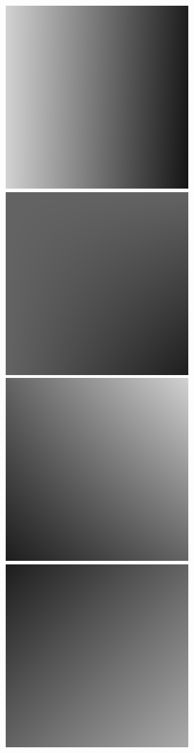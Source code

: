 \documentclass{beamer}
\begin{document}
\begin{frame}
    \begin{columns}[c]
        \includegraphics[scale=0.15]{Interpolated5DimImage1.png} \hspace{0.3pt}
        \includegraphics[scale=0.15]{Interpolated5DimImage2.png} \hspace{0.3pt}
        \includegraphics[scale=0.15]{Interpolated5DimImage3.png}\\ \hspace{17pt}
        \includegraphics[scale=0.15]{Interpolated5DimImage4.png} \hspace{0.3pt}

\end{columns}
\end{frame}
\end{document}
